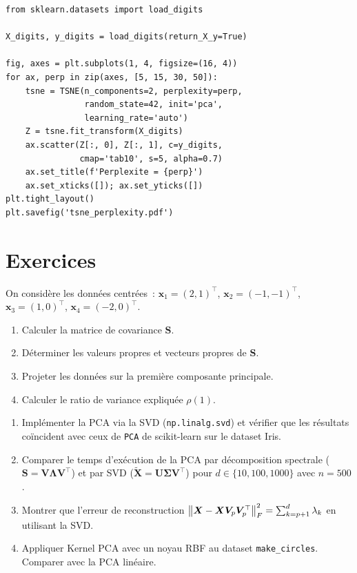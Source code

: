 \begin{codeblock}[title=\textbf{Effet de la perplexit\'e (t-SNE)}]
\begin{verbatim}
from sklearn.datasets import load_digits

X_digits, y_digits = load_digits(return_X_y=True)

fig, axes = plt.subplots(1, 4, figsize=(16, 4))
for ax, perp in zip(axes, [5, 15, 30, 50]):
    tsne = TSNE(n_components=2, perplexity=perp,
                random_state=42, init='pca',
                learning_rate='auto')
    Z = tsne.fit_transform(X_digits)
    ax.scatter(Z[:, 0], Z[:, 1], c=y_digits,
               cmap='tab10', s=5, alpha=0.7)
    ax.set_title(f'Perplexite = {perp}')
    ax.set_xticks([]); ax.set_yticks([])
plt.tight_layout()
plt.savefig('tsne_perplexity.pdf')
\end{verbatim}
\end{codeblock}

\section{Exercices}
\label{sec:exercises-ch9}

\begin{exercice}
On consid\`ere les donn\'ees centr\'ees~:
$\bm{x}_1 = (2,1)^\top$, $\bm{x}_2 = (-1, -1)^\top$,
$\bm{x}_3 = (1, 0)^\top$, $\bm{x}_4 = (-2, 0)^\top$.
\begin{enumerate}
  \item Calculer la matrice de covariance $\bm{S}$.
  \item D\'eterminer les valeurs propres et vecteurs propres de $\bm{S}$.
  \item Projeter les donn\'ees sur la premi\`ere composante principale.
  \item Calculer le ratio de variance expliqu\'ee $\rho(1)$.
\end{enumerate}
\end{exercice}

\begin{exercice}
\begin{enumerate}
  \item Impl\'ementer la PCA via la SVD (\texttt{np.linalg.svd}) et v\'erifier
    que les r\'esultats co\"incident avec ceux de \texttt{PCA} de scikit-learn
    sur le dataset Iris.
  \item Comparer le temps d'ex\'ecution de la PCA par d\'ecomposition spectrale
    ($\bm{S} = \bm{V}\bm{\Lambda}\bm{V}^\top$) et par SVD
    ($\tilde{\bm{X}} = \bm{U}\bm{\Sigma}\bm{V}^\top$) pour
    $d \in \{10, 100, 1000\}$ avec $n = 500$.
  \item Montrer que l'erreur de reconstruction
    $\left\| \bm{X} - \bm{X}\bm{V}_p\bm{V}_p^\top \right\|_F^2 = \sum_{k=p+1}^d
    \lambda_k$ en utilisant la SVD.
  \item Appliquer Kernel PCA avec un noyau RBF au dataset
    \texttt{make\_circles}. Comparer avec la PCA lin\'eaire.
\end{enumerate}
\end{exercice}

